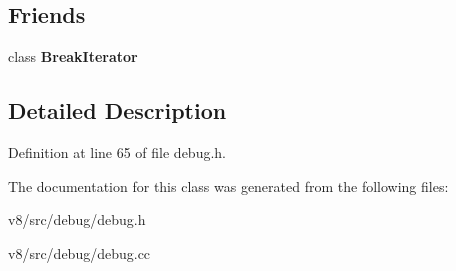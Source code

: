 \subsection*{Friends}
\begin{DoxyCompactItemize}
\item 
\mbox{\label{classv8_1_1internal_1_1BreakLocation_a5fbb7407696454879cf016b20a0380f0}} 
class {\bfseries Break\+Iterator}
\end{DoxyCompactItemize}


\subsection{Detailed Description}


Definition at line 65 of file debug.\+h.



The documentation for this class was generated from the following files\+:\begin{DoxyCompactItemize}
\item 
v8/src/debug/debug.\+h\item 
v8/src/debug/debug.\+cc\end{DoxyCompactItemize}
